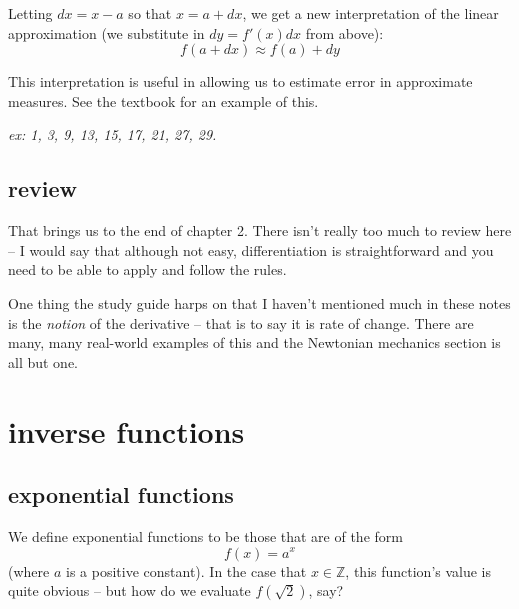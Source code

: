 \documentclass[10pt,a4paper]{report}
\begin{document}
Letting $dx = x - a$ so that $x = a + dx$, we get a new interpretation of the linear approximation (we substitute in $dy = f'(x)dx$ from above):
$$
	f(a + dx) \approx f(a) + dy
$$

This interpretation is useful in allowing us to estimate error in approximate measures. See the textbook for an example of this.


\emph{ex: 1,  3,  9,  13,  15,  17,  21,  27, 29.}

\section*{review}

That brings us to the end of chapter 2. There isn't really too much to review here -- I would say that although not easy, differentiation is straightforward and you need to be able to apply and follow the rules. 

One thing the study guide harps on that I haven't mentioned much in these notes is the \emph{notion} of the derivative -- that is to say it is rate of change. There are many, many real-world examples of this and the Newtonian mechanics section is all but one.



















\chapter{inverse functions}


\section{exponential functions}

We define exponential functions to be those that are of the form
$$
	f(x) = a^x
$$
(where $a$ is a positive constant). In the case that $x \in \mathbb{Z}$, this function's value is quite obvious -- but how do we evaluate $f(\sqrt{2})$, say?
\end{document}
